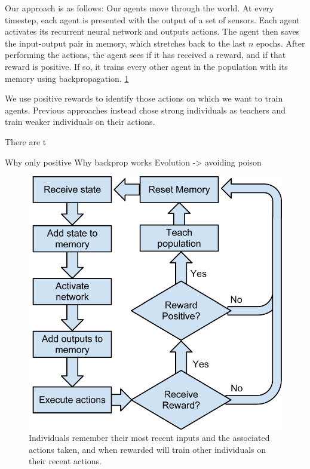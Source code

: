 \documentclass{acm_proc_article-sp}
\begin{document}
Our approach is as follows:
Our agents move through the world. 
At every timestep, each agent is presented with the output of a set of sensors.  
Each agent activates its recurrent neural network and outputs actions.
The agent then saves the input-output pair in memory, which stretches back to the last $n$ epochs.
After performing the actions, the agent sees if it has received a reward, and if that reward is positive.
If so, it trains every other agent in the population with its memory using backpropagation. \ref{fig:flowchart}

We use positive rewards to identify those actions on which we want to train agents.
 Previous approaches \cite{?} instead chose strong individuals as teachers and train weaker individuals on their actions.
 
 There are t

Why only positive
    Why backprop works
    Evolution -> avoiding poison

\begin{figure}
  \centering
    \includegraphics[scale=.6]{flowchart.pdf}
  \caption{Individuals remember their most recent inputs and the associated actions taken, and when rewarded will train other individuals on their recent actions.}
  \label{fig:flowchart}
\end{figure}
\end{document}
